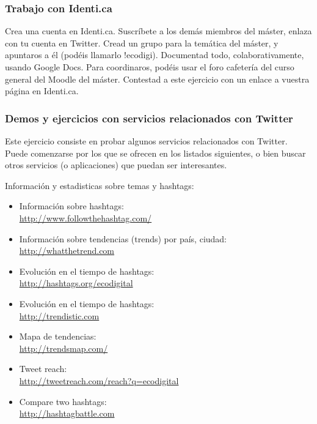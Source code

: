 \documentclass[a4paper,12pt]{article}
\begin{document}
\subsubsection{Trabajo con Identi.ca}
\label{sub:identica}

Crea una cuenta en Identi.ca. Suscríbete a los demás miembros del máster, enlaza con tu cuenta en Twitter. Cread un grupo para la temática del máster, y apuntaros a él (podéis llamarlo !ecodigi). Documentad todo, colaborativamente, usando Google Docs. Para coordinaros, podéis usar el foro cafetería del curso general del Moodle del máster. Contestad a este ejercicio con un enlace a vuestra página en Identi.ca.

\subsubsection{Demos y ejercicios con servicios relacionados con Twitter}
\label{sub:twitter-relacion}

Este ejercicio consiste en probar algunos servicios relacionados con Twitter. Puede comenzarse por los que se ofrecen en los listados siguientes, o bien buscar otros servicios (o aplicaciones) que puedan ser interesantes.

Información y estadisticas sobre temas y hashtags:

\begin{itemize}
\item Información sobre hashtags: \\
   \url{http://www.followthehashtag.com/}

\item Información sobre tendencias (trends) por país, ciudad: \\
   \url{http://whatthetrend.com}

\item Evolución en el tiempo de hashtags: \\
   \url{http://hashtags.org/ecodigital}
   
\item Evolución en el tiempo de hashtags: \\
  \url{http://trendistic.com}

\item Mapa de tendencias: \\
  \url{http://trendsmap.com/}

\item Tweet reach: \\
  \url{http://tweetreach.com/reach?q=ecodigital}

\item Compare two hashtags: \\
  \url{http://hashtagbattle.com}
\end{itemize}
\end{document}
